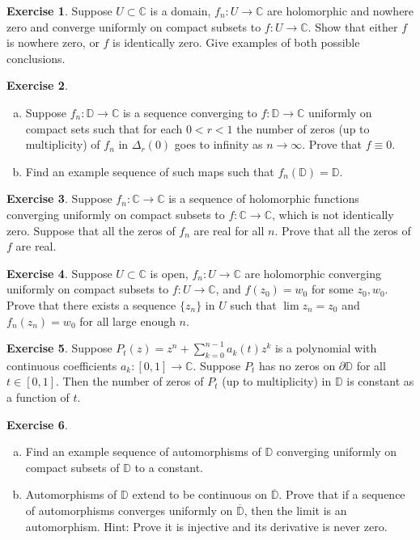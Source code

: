 \documentclass[12pt,openany]{book}
\newcommand{\C}{{\mathbb{C}}}
\newcommand{\D}{{\mathbb{D}}}
\theoremstyle{plain}
\theoremstyle{remark}
\theoremstyle{definition}
\newenvironment{exbox}{%
    \def\FrameCommand{\vrule width 1pt \relax\hspace{10pt}}%
    \MakeFramed{\advance\hsize-\width\FrameRestore}%
}{%
    \endMakeFramed
}
\newenvironment{exparts}{%
    \leavevmode\begin{enumerate}[a),noitemsep,topsep=0pt,parsep=0pt,partopsep=0pt]
}{%
    \end{enumerate}
}
\theoremstyle{exercise}
\newtheorem{exercise}{Exercise}[section]
\theoremstyle{example}
\begin{document}
\begin{exbox}
\begin{exercise}
Suppose $U \subset \C$ is a domain,
$f_n \colon U \to \C$ are holomorphic and nowhere zero
and converge uniformly on compact subsets to $f \colon U \to \C$.
Show that either $f$ is nowhere zero, or $f$ is identically zero.
Give examples of both possible conclusions.
\end{exercise}

\begin{exercise}
\begin{exparts}
\item
Suppose $f_n \colon \D \to \C$ is a sequence converging
to $f \colon \D \to \C$ uniformly on compact sets such that
for each $0 < r < 1$ the number of zeros (up to multiplicity)
of $f_n$ in $\Delta_r(0)$ goes to infinity as $n \to \infty$.
Prove that $f \equiv 0$.
\item
Find an example sequence of such maps such that $f_n(\D) = \D$.
\end{exparts}
\end{exercise}

\begin{exercise}
Suppose 
$f_n \colon \C \to \C$ is a sequence of holomorphic
functions
converging uniformly on compact subsets to $f \colon \C \to \C$,
which is not identically zero.
Suppose that all the zeros of $f_n$ are real for all $n$.
Prove that all the zeros of $f$ are real.
\end{exercise}

\begin{exercise}
Suppose $U \subset \C$ is open,
$f_n \colon U \to \C$ are holomorphic
converging uniformly on compact subsets to $f \colon U \to \C$,
and $f(z_0) = w_0$ for some $z_0, w_0$.  
Prove that there exists a sequence $\{ z_n \}$ in $U$ such that
$\lim z_n = z_0$ and $f_n(z_n) = w_0$ for all large enough $n$.
\end{exercise}

\begin{exercise}
Suppose $P_t(z) = z^n + \sum_{k=0}^{n-1} a_k(t) z^k$ is a polynomial
with continuous coefficients $a_k \colon [0,1] \to \C$.  Suppose $P_t$ has
no zeros on $\partial \D$ for all $t \in [0,1]$.  Then the number of zeros
of $P_t$ (up to multiplicity) in $\D$ is constant as a function of $t$.
\end{exercise}

\begin{exercise}
\begin{exparts}
\item
Find an example sequence of automorphisms of $\D$ converging
uniformly on compact subsets of $\D$ to a constant.
\item
Automorphisms of $\D$ extend to be continuous on
$\overline{\D}$.  Prove that if a sequence
of automorphisms converges uniformly on $\overline{\D}$, then
the limit is an automorphism. Hint: Prove it is injective
and its derivative is never zero.
\end{exparts}
\end{exercise}


\end{exbox}
\end{document}

